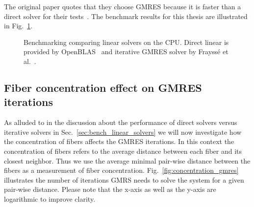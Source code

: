 The original paper quotes that they choose GMRES because it is faster than a direct solver for their tests~\cite{Tornberg2006}. The benchmark results for this thesis are illustrated in Fig.~\ref{fig:bench_openmp_solvers}.

\begin{figure}[!htbp]
  \centering
  \caption[Benchmark linear solvers on CPU.]{Benchmarking comparing linear solvers on the CPU. Direct linear is provided by OpenBLAS~\cite{OpenBLAS} and iterative GMRES solver by Frayssé et al.~\cite{Fraysse2003}.}
  \label{fig:bench_openmp_solvers}
\end{figure}

\subsection{Fiber concentration effect on GMRES iterations}
\label{sec:example_concentration_gmres}

As alluded to in the discussion about the performance of direct solvers versus iterative solvers in Sec.~\ref{sec:bench_linear_solvers} we will now investigate how the concentration of fibers affects the GMRES iterations. In this context the concentration of fibers refers to the average distance between each fiber and its closest neighbor. Thus we use the average minimal pair-wise distance between the fibers as a measurement of fiber concentration. Fig.~\ref{fig:concentration_gmres} illustrates the number of iterations GMRS needs to solve the system for a given pair-wise distance. Please note that the x-axis as well as the y-axis are logarithmic to improve clarity.

